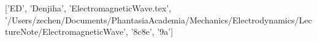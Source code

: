 ['ED', 'Denjiha', 'ElectromagneticWave.tex', '/Users/zechen/Documents/PhantasiaAcademia/Mechanics/Electrodynamics/LectureNote/ElectromagneticWave', '\x8c\xaf{}\x8e\xaf\xbc{}\xbd{}', '\xaf\xbc{}\xae{}\xae{}\x9a\xac{}\xae{}\xae\xba']
